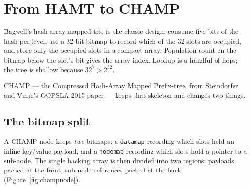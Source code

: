 \documentclass[11pt,twoside,openright]{book}
\newcommand{\code}[1]{\texorpdfstring{\textcolor{d7ink}{\texttt{#1}}}{#1}}
\begin{document}
\section{From HAMT to CHAMP}

Bagwell's hash array mapped trie is the classic design: consume five bits of the
hash per level, use a 32-bit bitmap to record which of the 32 slots are
occupied, and store only the occupied slots in a compact array. Population count
on the bitmap below the slot's bit gives the array index. Lookup is a handful of
hops; the tree is shallow because $32^7 > 2^{32}$.

CHAMP --- the Compressed Hash-Array Mapped Prefix-tree, from Steindorfer and
Vinju's OOPSLA 2015 paper --- keeps that skeleton and changes two things.

\subsection{The bitmap split}

A CHAMP node keeps \emph{two} bitmaps: a \code{datamap} recording which slots
hold an inline key/value payload, and a \code{nodemap} recording which slots
hold a pointer to a sub-node. The single backing array is then divided into two
regions: payloads packed at the front, sub-node references packed at the back
(Figure~\ref{fig:champnode}).
\end{document}
